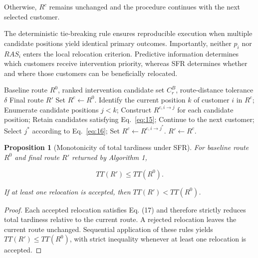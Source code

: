 \documentclass[11pt,a4paper]{article}
\newtheorem{proposition}{Proposition}
\begin{document}
Otherwise, \(R^{c}\) remains unchanged and the procedure continues with
the next selected customer.

The deterministic tie-breaking rule ensures reproducible execution when
multiple candidate positions yield identical primary outcomes.
Importantly, neither \(p_{i}\) nor \(RAS_{i}\) enters the local
relocation criterion. Predictive information determines which customers
receive intervention priority, whereas SFR determines whether and where
those customers can be beneficially relocated.

\begin{algorithm}[htbp]
\caption{Selective Forward Relocation (SFR)}
\label{alg:sfr}
\begin{algorithmic}[1]
\Require Baseline route $R^{0}$, ranked intervention candidate set $C_{r}^{B}$, route-distance tolerance $\delta$
\Ensure Final route $R'$
\State Set $R^{c} \leftarrow R^{0}$.
    \State Identify the current position $k$ of customer $i$ in $R^{c}$;
    \State Enumerate candidate positions $j < k$;
    \State Construct $R^{c,i \rightarrow j}$ for each candidate position;
    \State Retain candidates satisfying Eq.~\eqref{eq:15};
        \State Continue to the next customer;
    \EndIf
    \State Select $j^{*}$ according to Eq.~\eqref{eq:16};
        \State Set $R^{c} \leftarrow R^{c,i \rightarrow j^{*}}$.
    \EndIf
\EndFor
\State \Return $R' \leftarrow R^{c}$.
\end{algorithmic}
\end{algorithm}

\begin{proposition}[Monotonicity of total tardiness under SFR]
For baseline route \(R^{0}\) \emph{and final route} \(R'\)
\emph{returned by Algorithm 1,}

\begin{equation}
TT\left( R' \right) \leq TT\left( R^{0} \right).
\label{eq:18}
\end{equation}

\emph{If at least one relocation is accepted, then}
\(TT\left( R' \right) < TT\left( R^{0} \right)\)\emph{.}

\end{proposition}

\begin{proof} Each accepted relocation satisfies Eq. (17) and
therefore strictly reduces total tardiness relative to the current
route. A rejected relocation leaves the current route unchanged.
Sequential application of these rules yields
\(TT\left( R' \right) \leq TT\left( R^{0} \right)\), with strict
inequality whenever at least one relocation is accepted.
\end{proof}
\end{document}
